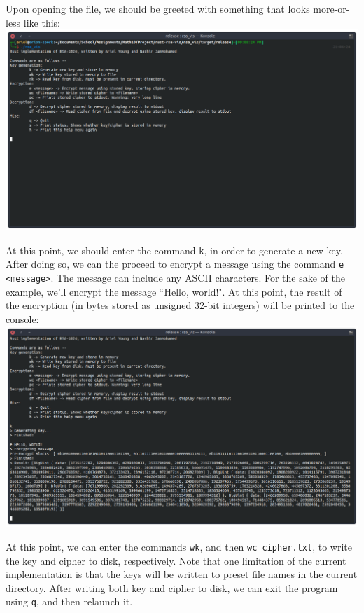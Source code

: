 \documentclass{article}
\newcommand{\code}[1]{\colorbox{light-gray}{\texttt{#1}}}
\begin{document}
Upon opening the file, we should be  greeted with something that looks more-or-less like this: \\
\includegraphics[width=\textwidth]{one}

At this point, we should enter the command \code{k}, in order to generate a new key. After doing so, we can the proceed to encrypt a message using the command \code{e <message>}. The message can include any ASCII characters. For the sake of the example, we'll encrypt the message ``Hello, world!". At this point, the result of the encryption (in bytes stored as unsigned 32-bit integers) will be printed to the console: \\
\includegraphics[width=\textwidth]{two}

At this point, we can enter the commands \code{wk}, and then \code{wc cipher.txt}, to write the key and cipher to disk, respectively. Note that one limitation of the current implementation is that the keys will be written to preset file names in the current directory. After writing both key and cipher to disk, we can exit the program using \code{q}, and then relaunch it. \\
\end{document}
